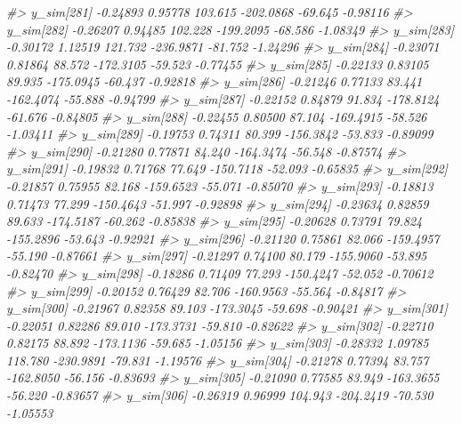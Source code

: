 \documentclass[
  10pt,
  italian,
  a4paper,
  extrafontsizes,onecolumn,openright
  ]{memoir}
\newenvironment{Shaded}{\begin{snugshade}}{\end{snugshade}}
\newcommand{\CommentTok}[1]{\textcolor[rgb]{0.56,0.35,0.01}{\textit{#1}}}
\begin{document}
\begin{Shaded}
\begin{Highlighting}[]
\CommentTok{\#\textgreater{} y\_sim[281] {-}0.24893 0.95778 103.615 {-}202.0868 {-}69.645 {-}0.98116}
\CommentTok{\#\textgreater{} y\_sim[282] {-}0.26207 0.94485 102.228 {-}199.2095 {-}68.586 {-}1.08349}
\CommentTok{\#\textgreater{} y\_sim[283] {-}0.30172 1.12519 121.732 {-}236.9871 {-}81.752 {-}1.24296}
\CommentTok{\#\textgreater{} y\_sim[284] {-}0.23071 0.81864  88.572 {-}172.3105 {-}59.523 {-}0.77455}
\CommentTok{\#\textgreater{} y\_sim[285] {-}0.22133 0.83105  89.935 {-}175.0945 {-}60.437 {-}0.92818}
\CommentTok{\#\textgreater{} y\_sim[286] {-}0.21246 0.77133  83.441 {-}162.4074 {-}55.888 {-}0.94799}
\CommentTok{\#\textgreater{} y\_sim[287] {-}0.22152 0.84879  91.834 {-}178.8124 {-}61.676 {-}0.84805}
\CommentTok{\#\textgreater{} y\_sim[288] {-}0.22455 0.80500  87.104 {-}169.4915 {-}58.526 {-}1.03411}
\CommentTok{\#\textgreater{} y\_sim[289] {-}0.19753 0.74311  80.399 {-}156.3842 {-}53.833 {-}0.89099}
\CommentTok{\#\textgreater{} y\_sim[290] {-}0.21280 0.77871  84.240 {-}164.3474 {-}56.548 {-}0.87574}
\CommentTok{\#\textgreater{} y\_sim[291] {-}0.19832 0.71768  77.649 {-}150.7118 {-}52.093 {-}0.65835}
\CommentTok{\#\textgreater{} y\_sim[292] {-}0.21857 0.75955  82.168 {-}159.6523 {-}55.071 {-}0.85070}
\CommentTok{\#\textgreater{} y\_sim[293] {-}0.18813 0.71473  77.299 {-}150.4643 {-}51.997 {-}0.92898}
\CommentTok{\#\textgreater{} y\_sim[294] {-}0.23634 0.82859  89.633 {-}174.5187 {-}60.262 {-}0.85838}
\CommentTok{\#\textgreater{} y\_sim[295] {-}0.20628 0.73791  79.824 {-}155.2896 {-}53.643 {-}0.92921}
\CommentTok{\#\textgreater{} y\_sim[296] {-}0.21120 0.75861  82.066 {-}159.4957 {-}55.190 {-}0.87661}
\CommentTok{\#\textgreater{} y\_sim[297] {-}0.21297 0.74100  80.179 {-}155.9060 {-}53.895 {-}0.82470}
\CommentTok{\#\textgreater{} y\_sim[298] {-}0.18286 0.71409  77.293 {-}150.4247 {-}52.052 {-}0.70612}
\CommentTok{\#\textgreater{} y\_sim[299] {-}0.20152 0.76429  82.706 {-}160.9563 {-}55.564 {-}0.84817}
\CommentTok{\#\textgreater{} y\_sim[300] {-}0.21967 0.82358  89.103 {-}173.3045 {-}59.698 {-}0.90421}
\CommentTok{\#\textgreater{} y\_sim[301] {-}0.22051 0.82286  89.010 {-}173.3731 {-}59.810 {-}0.82622}
\CommentTok{\#\textgreater{} y\_sim[302] {-}0.22710 0.82175  88.892 {-}173.1136 {-}59.685 {-}1.05156}
\CommentTok{\#\textgreater{} y\_sim[303] {-}0.28332 1.09785 118.780 {-}230.9891 {-}79.831 {-}1.19576}
\CommentTok{\#\textgreater{} y\_sim[304] {-}0.21278 0.77394  83.757 {-}162.8050 {-}56.156 {-}0.83693}
\CommentTok{\#\textgreater{} y\_sim[305] {-}0.21090 0.77585  83.949 {-}163.3655 {-}56.220 {-}0.83657}
\CommentTok{\#\textgreater{} y\_sim[306] {-}0.26319 0.96999 104.943 {-}204.2419 {-}70.530 {-}1.05553}

\end{Highlighting}
\end{Shaded}
\end{document}
